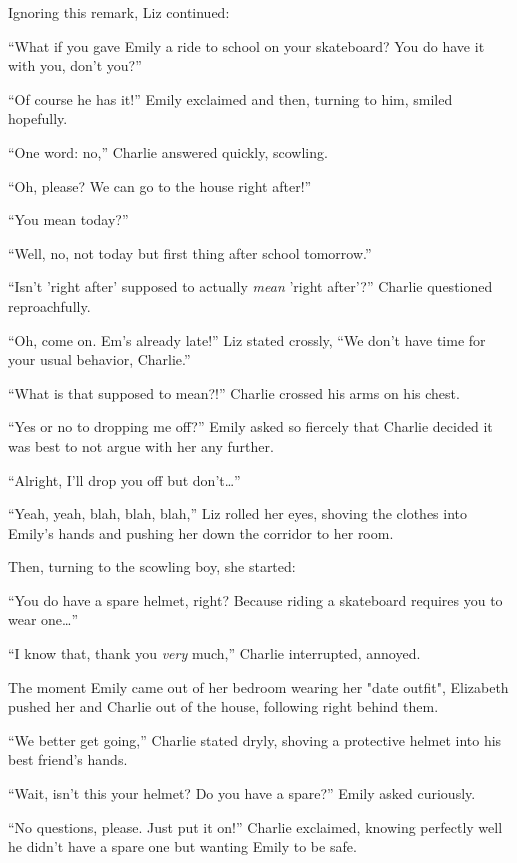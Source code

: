 Ignoring this remark, Liz continued:

“What if you gave Emily a ride to school on your skateboard? You do have it with you, don't you?”

“Of course he has it!” Emily exclaimed and then, turning to him, smiled hopefully.

“One word: no,” Charlie answered quickly, scowling.

“Oh, please? We can go to the house right after!”

“You mean today?”

“Well, no, not today but first thing after school tomorrow.”

“Isn't 'right after' supposed to actually \textit{mean} 'right after'?” Charlie questioned reproachfully.

“Oh, come on. Em's already late!” Liz stated crossly, “We don't have time for your usual behavior, Charlie.”

“What is that supposed to mean?!” Charlie crossed his arms on his chest.

“Yes or no to dropping me off?” Emily asked so fiercely that Charlie decided it was best to not argue with her any further.

“Alright, I'll drop you off but don't…”

“Yeah, yeah, blah, blah, blah,” Liz rolled her eyes, shoving the clothes into Emily's hands and pushing her down the corridor to her room.

Then, turning to the scowling boy, she started:

“You do have a spare helmet, right? Because riding a skateboard requires you to wear one…”

“I know that, thank you \textit{very} much,” Charlie interrupted, annoyed.

The moment Emily came out of her bedroom wearing her "date outfit", Elizabeth pushed her and Charlie out of the house, following right behind them.

“We better get going,” Charlie stated dryly, shoving a protective helmet into his best friend's hands.

“Wait, isn't this your helmet? Do you have a spare?” Emily asked curiously.

“No questions, please. Just put it on!” Charlie exclaimed, knowing perfectly well he didn't have a spare one but wanting Emily to be safe.